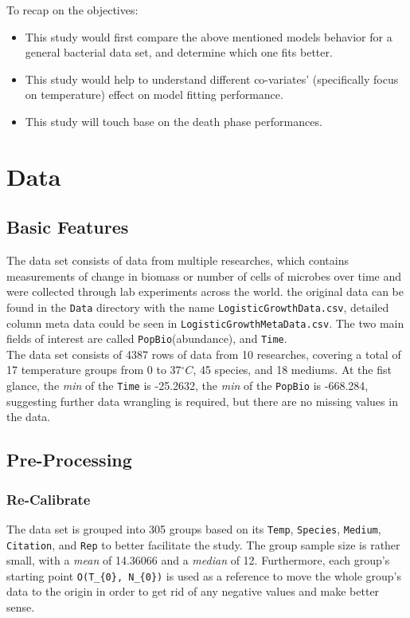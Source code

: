 \documentclass[11pt]{article}
\begin{document}
To recap on the objectives:
\begin{itemize}
  \item This study would first compare the above mentioned models behavior for a general bacterial data set, and determine which one fits better.
  \item This study would help to understand different co-variates' (specifically focus on temperature) effect on model fitting performance.
  \item This study will touch base on the death phase performances.
\end{itemize}


\section{Data}
\subsection{Basic Features}
The data set consists of data from multiple researches, which contains measurements of change in biomass or number of cells of microbes over time and were collected through lab experiments across the world. the original data can be found in the \verb|Data| directory with the name \verb|LogisticGrowthData.csv|, detailed column meta data could be seen in \verb|LogisticGrowthMetaData.csv|. The two main fields of interest are called \verb|PopBio|(abundance), and \verb|Time|.\\
The data set consists of 4387 rows of data from 10 researches, covering a total of 17 temperature groups from 0 to 37$^\circ C$, 45 species, and 18 mediums. At the fist glance, the \emph{min} of the \verb|Time| is -25.2632, the \emph{min} of the \verb|PopBio| is -668.284, suggesting further data wrangling is required, but there are no missing values in the data.
\subsection{Pre-Processing}
\subsubsection{Re-Calibrate}
The data set is grouped into 305 groups based on its \verb|Temp|, \verb|Species|, \verb|Medium|, \verb|Citation|, and \verb|Rep| to better facilitate the study. The group sample size is rather small, with a \emph{mean} of 14.36066 and a \emph{median} of 12. Furthermore, each group's starting point \verb|O(T_{0}, N_{0})| is used as a reference to move the whole group's data to the origin in order to get rid of any negative values and make better sense.
\end{document}
